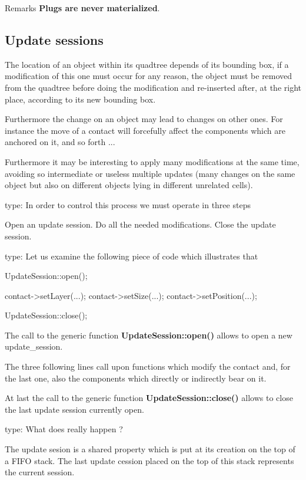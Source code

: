 \begin{DoxyRemark}{Remarks}
{\bfseries Plugs are never materialized}.
\end{DoxyRemark}
\hypertarget{classHurricane_1_1Go_secGoUpdateSessions}{}\subsection{Update sessions}\label{classHurricane_1_1Go_secGoUpdateSessions}
The location of an object within its quadtree depends of its bounding box, if a modification of this one must occur for any reason, the object must be removed from the quadtree before doing the modification and re-\/inserted after, at the right place, according to its new bounding box.

Furthermore the change on an object may lead to changes on other ones. For instance the move of a contact will forcefully affect the components which are anchored on it, and so forth ...

Furthermore it may be interesting to apply many modifications at the same time, avoiding so intermediate or useless multiple updates (many changes on the same object but also on different objects lying in different unrelated cells).

type\+: In order to control this process we must operate in three steps

Open an update session. Do all the needed modifications. Close the update session.

type\+: Let us examine the following piece of code which illustrates that 
\begin{DoxyCode}
UpdateSession::open();
 
contact->setLayer(...);
contact->setSize(...);
contact->setPosition(...);
 
UpdateSession::close();
\end{DoxyCode}
 The call to the generic function {\bfseries Update\+Session\+::open()} allows to open a new update\+\_\+session.

The three following lines call upon functions which modify the contact and, for the last one, also the components which directly or indirectly bear on it.

At last the call to the generic function {\bfseries Update\+Session\+::close()} allows to close the last update session currently open.

type\+: What does really happen ?

The update sesion is a shared property which is put at its creation on the top of a F\+I\+FO stack. The last update cession placed on the top of this stack represents the current session.

